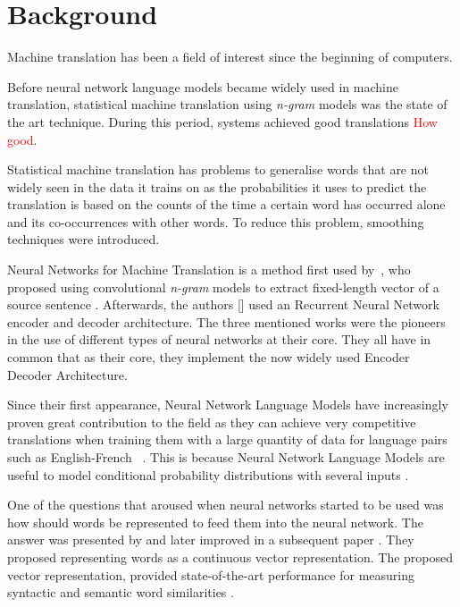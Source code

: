 \chapter{Background}\label{ch:chapter2}

Machine translation has been a field of interest since the beginning of computers.

Before neural network language models became widely used in machine translation, statistical machine translation using \textit{n-gram} models was the state of the art technique. During this period, systems achieved good translations \textcolor{red}{How good}.

Statistical machine translation has problems to generalise words that are not widely seen in the data it trains on as the probabilities it uses to predict the translation is based on the counts of the time a certain word has occurred alone and its co-occurrences with other words. To reduce this problem, smoothing techniques were introduced. 

Neural Networks for Machine Translation is a method first used by~\citet*{kalchbrenner13emnlp}, who proposed using convolutional \textit{n-gram} models to extract fixed-length vector of a source sentence \citep{DBLP:journals/corr/ChungGCB14}. Afterwards, the authors [\citealp{DBLP:journals/corr/SutskeverVL14,DBLP:journals/corr/ChoMGBSB14}] used an Recurrent Neural Network encoder and decoder architecture. The three mentioned works were the pioneers in the use of different types of neural networks at their core. They all have in common that as their core, they implement the now widely used Encoder Decoder Architecture.

Since their first appearance, Neural Network Language Models have increasingly proven great contribution to the field as they can achieve very competitive translations when training them with a large quantity of data for language pairs such as English-French ~\citep*{DBLP:journals/corr/ZophYMK16}. This is because Neural Network Language Models are useful to model conditional probability distributions with several inputs \citep{DBLP:journals/corr/abs-1709-07809}. 

One of the questions that aroused when neural networks started to be used was how should words be represented to feed them into the neural network. The answer was presented by \citet*{DBLP:journals/corr/abs-1301-3781} and later improved in a subsequent paper \citep{DBLP:journals/corr/MikolovSCCD13}. They proposed representing words as a continuous vector representation. The proposed vector representation, provided state-of-the-art performance for measuring syntactic and semantic word similarities \citep{DBLP:journals/corr/abs-1301-3781}.

